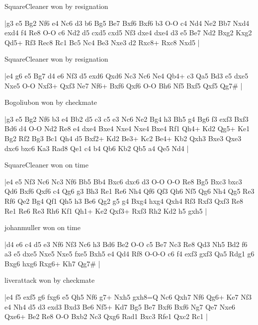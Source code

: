 \showboard

SquareCleaner won by resignation

\makegametitle
|g3 e5 Bg2 Nf6 e4 Nc6 d3 b6 Bg5 Be7 Bxf6 Bxf6 b3 O-O c4 Nd4 Ne2 Bb7 Nxd4 exd4 f4 Re8 O-O c6 Nd2 d5 cxd5 cxd5 Nf3 dxe4 dxe4 d3 e5 Be7 Nd2 Bxg2 Kxg2 Qd5+ Rf3 Rec8 Rc1 Bc5 Nc4 Be3 Nxe3 d2 Rxc8+ Rxc8 Nxd5  |

\showboard

SquareCleaner won by resignation

\makegametitle
|e4 g6 e5 Bg7 d4 e6 Nf3 d5 exd6 Qxd6 Nc3 Nc6 Ne4 Qb4+ c3 Qa5 Bd3 e5 dxe5 Nxe5 O-O Nxf3+ Qxf3 Ne7 Nf6+ Bxf6 Qxf6 O-O Bh6 Nf5 Bxf5 Qxf5 Qg7\#  |

\showboard

Bogoliubon won by checkmate

\makegametitle
|g3 e5 Bg2 Nf6 b3 e4 Bb2 d5 c3 c5 e3 Nc6 Ne2 Bg4 h3 Bh5 g4 Bg6 f3 exf3 Bxf3 Bd6 d4 O-O Nd2 Re8 e4 dxe4 Bxe4 Nxe4 Nxe4 Bxe4 Rf1 Qh4+ Kd2 Qg5+ Ke1 Bg2 Rf2 Bg3 Bc1 Qh4 d5 Bxf2+ Kd2 Be3+ Kc2 Be4+ Kb2 Qxh3 Bxe3 Qxe3 dxc6 bxc6 Ka3 Rad8 Qe1 c4 b4 Qb6 Kb2 Qb5 a4 Qe5 Nd4  |

\showboard

SquareCleaner won on time

\makegametitle
|e4 e5 Nf3 Nc6 Nc3 Nf6 Bb5 Bb4 Bxc6 dxc6 d3 O-O O-O Re8 Bg5 Bxc3 bxc3 Qd6 Bxf6 Qxf6 c4 Qg6 g3 Bh3 Re1 Re6 Nh4 Qf6 Qf3 Qh6 Nf5 Qg6 Nh4 Qg5 Re3 Rf6 Qe2 Bg4 Qf1 Qh5 h3 Be6 Qg2 g5 g4 Bxg4 hxg4 Qxh4 Rf3 Rxf3 Qxf3 Re8 Re1 Re6 Re3 Rh6 Kf1 Qh1+ Ke2 Qxf3+ Rxf3 Rh2 Kd2 h5 gxh5  |

\showboard

johanmuller won on time

\makegametitle
|d4 e6 c4 d5 e3 Nf6 Nf3 Nc6 h3 Bd6 Be2 O-O c5 Be7 Nc3 Re8 Qd3 Nh5 Bd2 f6 a3 e5 dxe5 Nxe5 Nxe5 fxe5 Bxh5 e4 Qd4 Rf8 O-O-O c6 f4 exf3 gxf3 Qa5 Rdg1 g6 Bxg6 hxg6 Rxg6+ Kh7 Qg7\#  |

\showboard

liverattack won by checkmate

\makegametitle
|e4 f5 exf5 g6 fxg6 e5 Qh5 Nf6 g7+ Nxh5 gxh8=Q Nc6 Qxh7 Nf6 Qg6+ Ke7 Nf3 e4 Nh4 d5 d3 exd3 Bxd3 Be6 Nf5+ Kd7 Bg5 Be7 Bxf6 Bxf6 Ng7 Qe7 Nxe6 Qxe6+ Be2 Re8 O-O Bxb2 Nc3 Qxg6 Rad1 Bxc3 Rfe1 Qxc2 Rc1  |


